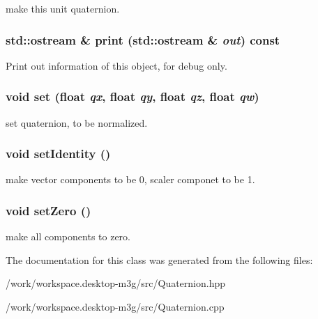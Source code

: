 make this unit quaternion. \hypertarget{classm3g_1_1Quaternion_6fea17fa1532df3794f8cb39cb4f911f}{
\subsubsection[{print}]{\setlength{\rightskip}{0pt plus 5cm}std::ostream \& print (std::ostream \& {\em out}) const}}
\label{classm3g_1_1Quaternion_6fea17fa1532df3794f8cb39cb4f911f}


Print out information of this object, for debug only. \hypertarget{classm3g_1_1Quaternion_0712dc357557a30ac0da0a9d4cdd278c}{
\subsubsection[{set}]{\setlength{\rightskip}{0pt plus 5cm}void set (float {\em qx}, \/  float {\em qy}, \/  float {\em qz}, \/  float {\em qw})}}
\label{classm3g_1_1Quaternion_0712dc357557a30ac0da0a9d4cdd278c}


set quaternion, to be normalized. \hypertarget{classm3g_1_1Quaternion_382e6ad7e6721b121e510959e1011be3}{
\subsubsection[{setIdentity}]{\setlength{\rightskip}{0pt plus 5cm}void setIdentity ()}}
\label{classm3g_1_1Quaternion_382e6ad7e6721b121e510959e1011be3}


make vector components to be 0, scaler componet to be 1. \hypertarget{classm3g_1_1Quaternion_47affd1a10b589811fc4828c1a2e0c6d}{
\subsubsection[{setZero}]{\setlength{\rightskip}{0pt plus 5cm}void setZero ()}}
\label{classm3g_1_1Quaternion_47affd1a10b589811fc4828c1a2e0c6d}


make all components to zero. 

The documentation for this class was generated from the following files:\begin{CompactItemize}
\item 
/work/workspace.desktop-m3g/src/Quaternion.hpp\item 
/work/workspace.desktop-m3g/src/Quaternion.cpp\end{CompactItemize}

